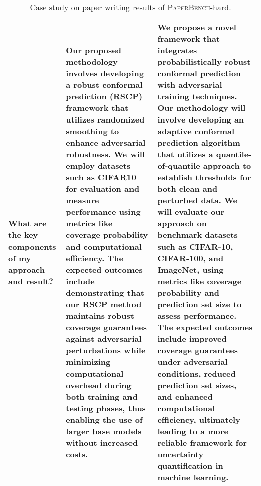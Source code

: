 \begin{table*}[htbp]
\begin{tabular}{p{3cm}p{6cm}p{6cm}}
What are the key components of my approach and result? & 
Our proposed methodology involves developing a robust conformal prediction (RSCP) framework that utilizes randomized smoothing to enhance adversarial robustness. We will employ datasets such as CIFAR10 for evaluation and measure performance using metrics like coverage probability and computational efficiency. The expected outcomes include demonstrating that our RSCP method maintains robust coverage guarantees against adversarial perturbations while minimizing computational overhead during both training and testing phases, thus enabling the use of larger base models without increased costs. &
We propose a novel framework that integrates probabilistically robust conformal prediction with adversarial training techniques. Our methodology will involve developing an adaptive conformal prediction algorithm that utilizes a quantile-of-quantile approach to establish thresholds for both clean and perturbed data. We will evaluate our approach on benchmark datasets such as CIFAR-10, CIFAR-100, and ImageNet, using metrics like coverage probability and prediction set size to assess performance. The expected outcomes include improved coverage guarantees under adversarial conditions, reduced prediction set sizes, and enhanced computational efficiency, ultimately leading to a more reliable framework for uncertainty quantification in machine learning.
\\
\bottomrule[1.1pt]
\end{tabular}
\caption{Case study on paper writing results of \textsc{PaperBench}-hard.}
\label{tab:paperbench hard}
\end{table*}


